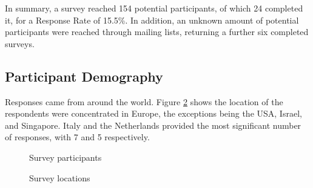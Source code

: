 In summary, a survey reached 154 potential participants, of which 24 completed it, for a Response Rate of 15.5\%.
In addition, an unknown amount of potential participants were reached through mailing lists, returning a further six completed surveys.

\subsection{Participant Demography}

Responses came from around the world.
Figure \ref{fig:Survey_locations} shows the location of the respondents were concentrated in Europe, the exceptions being the USA, Israel, and Singapore.
Italy and the Netherlands provided the most significant number of responses, with 7 and 5 respectively.

\begin{figure}[H]
    \centering
    \caption{Survey participants}
    \label{fig:Survey_participants}
\end{figure}

\begin{figure}[H]
    \centering
    \caption{Survey locations}
    \label{fig:Survey_locations}
\end{figure}

